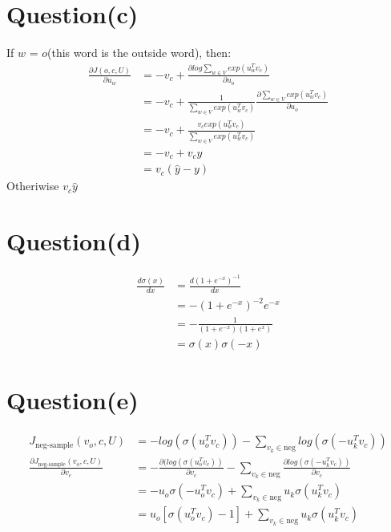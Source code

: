 \documentclass[11pt]{article}
\begin{document}
\section{Question(c)}
If $w$ = $o$(this word is the outside word), then:
\begin{equation}
\begin{aligned}
\frac{\partial J(o, c, U)}{\partial u_w} &= -v_c + \frac{\partial log\sum_{w \in V} exp(u_w^Tv_c)}{\partial u_o} \\
&= -v_c + \frac{1}{\sum_{w \in V} exp(u_w^Tv_c)}\frac{\partial{\sum_{w \in V} exp(u_w^Tv_c)}}{\partial u_o}\\ 
&= -v_c + \frac{v_cexp(u_w^Tv_c)}{\sum_{w \in V} exp(u_w^Tv_c)}\\
&= -v_c + v_c\hat y\\
&= v_c(\hat y - y)
\end{aligned}
\end{equation}
Otheriwise $v_c\hat y$
\section{Question(d)}
\begin{equation}
\begin{aligned}
\frac{d\sigma(x)}{d x} &= \frac{d(1+e^{-x})^{-1}}{dx} \\
&= -(1+e^{-x})^{-2} e^{-x} \\
&= -\frac{1}{(1+e^{-x})(1+e^x)} \\
&= \sigma(x)\sigma(-x)
\end{aligned}
\end{equation}
\section{Question(e)}
\begin{equation}
\begin{aligned}
J_{\text{neg-sample}}(v_o, c, U) &= -log(\sigma(u_o^Tv_c)) - \sum_{v_k \in \text{neg}}log(\sigma(-u_k^Tv_c))\\
\frac{\partial J_{\text{neg-sample}}(v_o, c, U)}{\partial v_c} &= -\frac{\partial(log(\sigma(u_o^Tv_c))}{\partial v_c} - \sum_{v_k \in \text{neg}}\frac{\partial log(\sigma(-u_k^Tv_c))}{\partial v_c}\\
&= -u_o\sigma(-u_o^Tv_c) + \sum_{v_k \in \text{neg}}u_k\sigma(u_k^Tv_c)\\
&= u_o[\sigma(u_o^Tv_c)-1] + \sum_{v_k \in \text{neg}}u_k\sigma(u_k^Tv_c)
\end{aligned}
\end{equation} 
\end{document}
